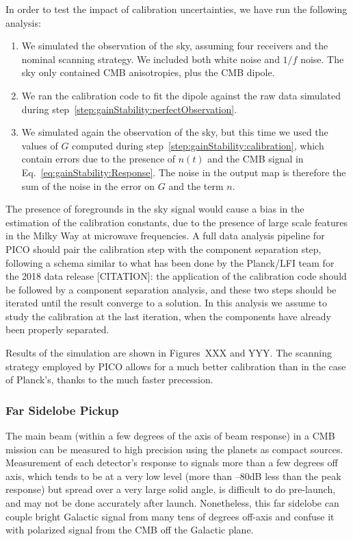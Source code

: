 \documentclass[PICOReport.tex]{subfiles}
\begin{document}
In order to test the impact of calibration uncertainties, we have run the following analysis:
\begin{enumerate}
\item\label{step:gainStability:perfectObservation} We simulated the observation of the sky, assuming four receivers and the nominal scanning strategy. We included both white noise and $1/f$ noise. The sky only contained CMB anisotropies, plus the CMB dipole.
\item\label{step:gainStability:calibration} We ran the calibration code to fit the dipole against the raw data simulated during step~\ref{step:gainStability:perfectObservation}.
\item\label{step:gainStability:imperfectObservation} We simulated again the observation of the sky, but this time we used the values of $G$ computed during step~\ref{step:gainStability:calibration}, which contain errors due to the presence of $n(t)$ and the CMB signal in Eq.~\eqref{eq:gainStability:Response}. The noise in the output map is therefore the sum of the noise in the error on $G$ and the term $n$.
\end{enumerate}
The presence of foregrounds in the sky signal would cause a bias in the estimation of the calibration constants, due to the presence of large scale features in the Milky Way at microwave frequencies. A full data analysis pipeline for PICO should pair the calibration step with the component separation step, following a schema similar to what has been done by the Planck/LFI team for the 2018 data release [CITATION]: the application of the calibration code should be followed by a component separation analysis, and these two steps should be iterated until the result converge to a solution. In this analysis we assume to study the calibration at the last iteration, when the components have already been properly separated.

Results of the simulation are shown in Figures~XXX and YYY. The scanning strategy employed by PICO allows for a much better calibration than in the case of Planck's, thanks to the much faster precession.

\subsubsection{Far Sidelobe Pickup}
\label{sec:fsl}
The main beam (within a few degrees of the axis of beam response) in a CMB mission can be measured to high precision using the planets as compact sources.  Measurement of each detector's response to signals more than a few degrees off axis, which tends to be at a very low level (more than --80dB less than the peak response) but spread over a very large solid angle, is difficult to do pre-launch, and may not be done accurately after launch.  Nonetheless, this far sidelobe can couple bright Galactic signal from many tens of degrees off-axis and confuse it with polarized signal from the CMB off the Galactic plane.  
\end{document}

